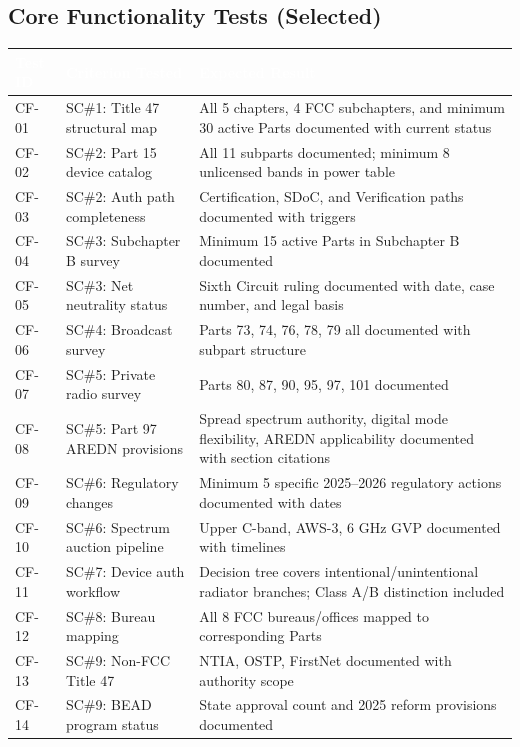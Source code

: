 \documentclass[11pt,letterpaper]{article}
\newcommand{\tableheader}[1]{\textbf{\sffamily\textcolor{white}{#1}}}
\begin{document}
\subsection{Core Functionality Tests (Selected)}

\begin{center}
\begin{tabularx}{\textwidth}{C{1.5cm}L{4cm}X}
\toprule
{}
\tableheader{Test ID} & \tableheader{Criterion Tested} & \tableheader{Expected Result} \\
\midrule
CF-01 & SC\#1: Title 47 structural map & All 5 chapters, 4 FCC subchapters, and minimum 30 active Parts documented with current status \\
CF-02 & SC\#2: Part 15 device catalog & All 11 subparts documented; minimum 8 unlicensed bands in power table \\
CF-03 & SC\#2: Auth path completeness & Certification, SDoC, and Verification paths documented with triggers \\
CF-04 & SC\#3: Subchapter B survey & Minimum 15 active Parts in Subchapter B documented \\
CF-05 & SC\#3: Net neutrality status & Sixth Circuit ruling documented with date, case number, and legal basis \\
CF-06 & SC\#4: Broadcast survey & Parts 73, 74, 76, 78, 79 all documented with subpart structure \\
CF-07 & SC\#5: Private radio survey & Parts 80, 87, 90, 95, 97, 101 documented \\
CF-08 & SC\#5: Part 97 AREDN provisions & Spread spectrum authority, digital mode flexibility, AREDN applicability documented with section citations \\
CF-09 & SC\#6: Regulatory changes & Minimum 5 specific 2025--2026 regulatory actions documented with dates \\
CF-10 & SC\#6: Spectrum auction pipeline & Upper C-band, AWS-3, 6 GHz GVP documented with timelines \\
CF-11 & SC\#7: Device auth workflow & Decision tree covers intentional/unintentional radiator branches; Class A/B distinction included \\
CF-12 & SC\#8: Bureau mapping & All 8 FCC bureaus/offices mapped to corresponding Parts \\
CF-13 & SC\#9: Non-FCC Title 47 & NTIA, OSTP, FirstNet documented with authority scope \\
CF-14 & SC\#9: BEAD program status & State approval count and 2025 reform provisions documented \\

\end{tabularx}
\end{center}
\end{document}

